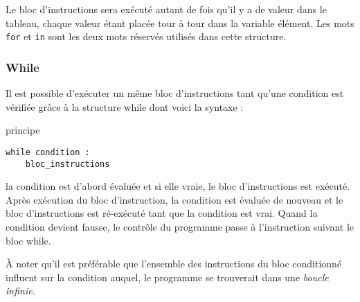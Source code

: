 Le bloc d'instructions sera exécuté autant de fois qu'il y a de
valeur dans le tableau, chaque valeur étant placée tour à tour dans la
variable élément.
Les mots \texttt{for} et \texttt{in} sont les deux mots réservés utilisés dans cette structure.







\subsubsection{While}

Il est possible d’exécuter un même bloc d’instructions tant qu’une condition est
vérifiée grâce à la structure while dont voici la syntaxe :
\vskip 2pt
\begin{center}
  \begin{myterminalbox}[colback=gray!10]{principe}
\begin{verbatim}
while condition :
    bloc_instructions
\end{verbatim}
  \end{myterminalbox}
\end{center}

la condition est d’abord évaluée et si elle vraie, le bloc
d’instructions est exécuté.
Après exécution du bloc d’instruction, la
condition est évaluée de nouveau et le bloc d’instructions est ré-exécuté tant que la
condition est vrai. Quand la condition devient fausse, le contrôle du programme passe
à l’instruction suivant le bloc while.

À noter qu'il est préférable que l'ensemble des instructions du bloc conditionné influent
sur la condition auquel, le programme se trouverait dans une \textit{boucle infinie}.
